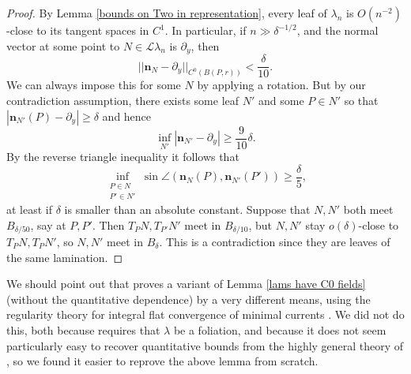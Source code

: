 \documentclass[reqno,11pt]{amsart}
\newcommand{\Leaves}{\mathscr L}
\newcommand{\normal}{\mathbf n}
\theoremstyle{definition}
\numberwithin{equation}{section}
\begin{document}
\begin{proof}
	By Lemma \ref{bounds on Two in representation}, every leaf of $\lambda_n$ is $O(n^{-2})$-close to its tangent spaces in $C^1$.
	In particular, if $n \gg \delta^{-1/2}$, and the normal vector at some point to $N \in \Leaves \lambda_n$ is $\partial_y$, then
	$$||\normal_N - \partial_y||_{C^0(B(P, r))} < \frac{\delta}{10}.$$
	We can always impose this for some $N$ by applying a rotation.
	But by our contradiction assumption, there exists some leaf $N'$ and some $P \in N'$ so that $|\normal_{N'}(P) - \partial_y| \geq \delta$ and hence
	$$\inf_{N'} |\normal_{N'} - \partial_y| \geq \frac{9}{10}\delta.$$
	By the reverse triangle inequality it follows that
	$$\inf_{\substack{P \in N\\ P' \in N'}} \sin \angle(\normal_N(P), \normal_{N'}(P')) \geq \frac{\delta}{5},$$
	at least if $\delta$ is smaller than an absolute constant.
	Suppose that $N, N'$ both meet $B_{\delta/50}$, say at $P, P'$. Then $T_PN, T_{P'} N'$ meet in $B_{\delta/10}$, but $N, N'$ stay $o(\delta)$-close to $T_PN, T_PN'$, so $N, N'$ meet in $B_\delta$. This is a contradiction since they are leaves of the same lamination.
\end{proof}

We should point out that \cite{Solomon86} proves a variant of Lemma \ref{lams have C0 fields} (without the quantitative dependence) by a very different means, using the regularity theory for integral flat convergence of minimal currents \cite[Theorem 5.3.14]{federer2014geometric}.
We did not do this, both because \cite{Solomon86} requires that $\lambda$ be a foliation, and because it does not seem particularly easy to recover quantitative bounds from the highly general theory of \cite[Chapter 5]{federer2014geometric}, so we found it easier to reprove the above lemma from scratch.
\end{document}
